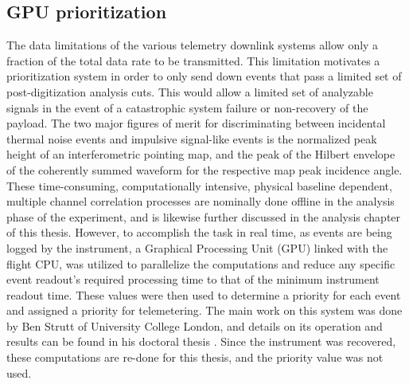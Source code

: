 	\begin{table}
	
	\end{table}
		
	\subsection{GPU prioritization}
		The data limitations of the various telemetry downlink systems allow only a fraction of the total data rate to be transmitted.  This limitation motivates a prioritization system in order to only send down events that pass a limited set of post-digitization analysis cuts.  This would allow a limited set of analyzable signals in the event of a catastrophic system failure or non-recovery of the payload.  The two major figures of merit for discriminating between incidental thermal noise events and impulsive signal-like events is the normalized peak height of an interferometric pointing map, and the peak of the Hilbert envelope of the coherently summed waveform for the respective map peak incidence angle.  These time-consuming, computationally intensive, physical baseline dependent, multiple channel correlation processes are nominally done offline in the analysis phase of the experiment, and is likewise further discussed in the analysis chapter of this thesis.  However, to accomplish the task in real time, as events are being logged by the instrument, a Graphical Processing Unit (GPU) linked with the flight CPU, was utilized to parallelize the computations and reduce any specific event readout's required processing time to that of the minimum instrument readout time.  These values were then used to determine a priority for each event and assigned a priority for telemetering.  The main work on this system was done by Ben Strutt of University College London, and details on its operation and results can be found in his doctoral thesis \cite{BenSThesis}.  Since the instrument was recovered, these computations are re-done for this thesis, and the priority value was not used.
		
